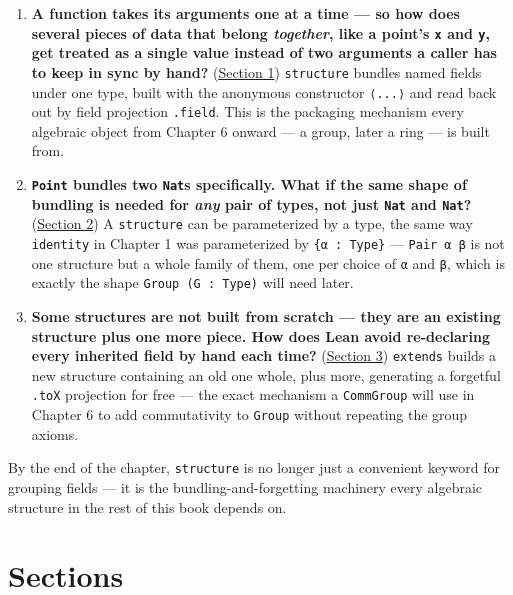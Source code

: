 \begin{enumerate}
\def\labelenumi{\arabic{enumi}.}
\tightlist
\item
  \textbf{A function takes its arguments one at a time --- so how does several pieces of data that belong \emph{together}, like a point's \texttt{x} and \texttt{y}, get treated as a single value instead of two arguments a caller has to keep in sync by hand?} (\hyperref[sec:02-functions-and-structures:01-structure-basics:1]{Section 1}) \texttt{structure} bundles named fields under one type, built with the anonymous constructor \texttt{⟨...⟩} and read back out by field projection \texttt{.field}. This is the packaging mechanism every algebraic object from Chapter 6 onward --- a group, later a ring --- is built from.
\item
  \textbf{\texttt{Point} bundles two \texttt{Nat}s specifically. What if the same shape of bundling is needed for \emph{any} pair of types, not just \texttt{Nat} and \texttt{Nat}?} (\hyperref[sec:02-functions-and-structures:02-type-parameters:1]{Section 2}) A \texttt{structure} can be parameterized by a type, the same way \texttt{identity} in Chapter 1 was parameterized by \texttt{\{α : Type\}} --- \texttt{Pair α β} is not one structure but a whole family of them, one per choice of \texttt{α} and \texttt{β}, which is exactly the shape \texttt{Group (G : Type)} will need later.
\item
  \textbf{Some structures are not built from scratch --- they are an existing structure plus one more piece. How does Lean avoid re-declaring every inherited field by hand each time?} (\hyperref[sec:02-functions-and-structures:03-extending-structures:1]{Section 3}) \texttt{extends} builds a new structure containing an old one whole, plus more, generating a forgetful \texttt{.toX} projection for free --- the exact mechanism a \texttt{CommGroup} will use in Chapter 6 to add commutativity to \texttt{Group} without repeating the group axioms.
\end{enumerate}

By the end of the chapter, \texttt{structure} is no longer just a convenient keyword for grouping fields --- it is the bundling-and-forgetting machinery every algebraic structure in the rest of this book depends on.

\section{Sections}\label{sec:02-functions-and-structures:00-index:3}

